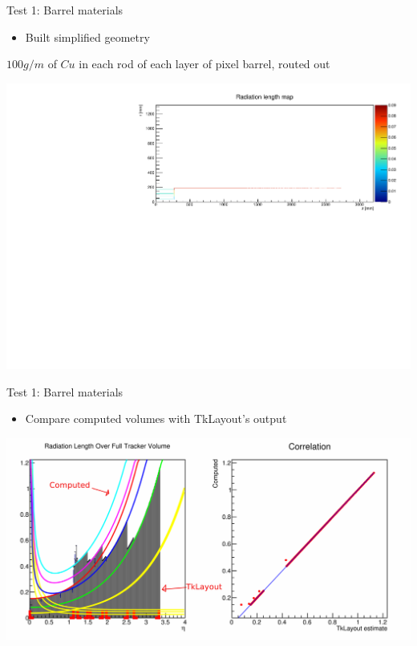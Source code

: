 \documentclass[pdftex, 11pt]{beamer}
\begin{document}
\begin{frame}{Test 1: Barrel materials}
  \begin{itemize}
  \item Built \alert{simplified} geometry
  \end{itemize}
  \begin{block}{}
    \alert{$100g/m$} of \alert{$Cu$} in each rod of each layer of pixel barrel, routed out
  \end{block}
  \begin{center}
    \includegraphics[width=\textwidth]{img/test2-map.pdf}
  \end{center}
\end{frame}
\begin{frame}{Test 1: Barrel materials}
  \begin{itemize}
  \item Compare \alert{computed} volumes with TkLayout's \alert{output}
  \end{itemize}
  \begin{center}
    \includegraphics[width=\textwidth]{img/test2-out.pdf}
  \end{center}
\end{frame}
\end{document}
